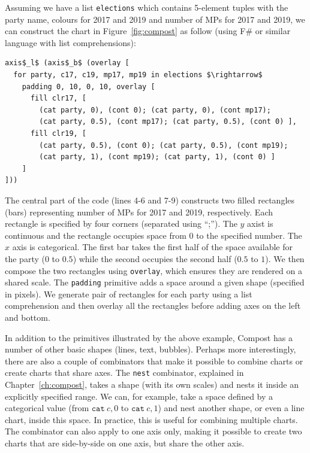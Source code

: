 \documentclass[fleqn,11pt]{report}
\theoremstyle{definition}
\begin{document}
Assuming we have a list \texttt{elections} which contains 5-element tuples with the party name,
colours for 2017 and 2019 and number of MPs for 2017 and 2019, we can construct the chart in
Figure~\ref{fig:compost} as follow (using F\# or similar language with list comprehensions):

\begin{lstlisting}[language=sharp,mathescape=true]
axis$_l$ (axis$_b$ (overlay [
  for party, c17, c19, mp17, mp19 in elections $\rightarrow$
    padding 0, 10, 0, 10, overlay [
      fill clr17, [
        (cat party, 0), (cont 0); (cat party, 0), (cont mp17);
        (cat party, 0.5), (cont mp17); (cat party, 0.5), (cont 0) ],
      fill clr19, [
        (cat party, 0.5), (cont 0); (cat party, 0.5), (cont mp19);
        (cat party, 1), (cont mp19); (cat party, 1), (cont 0) ]
    ]
]))
\end{lstlisting}

\noindent
The central part of the code (lines 4-6 and 7-9) constructs two filled rectangles (bars)
representing number of MPs for 2017 and 2019, respectively. Each rectangle is specified
by four corners (separated using ``;''). The $y$ axist is continuous and the rectangle occupies
space from 0 to the specified number. The $x$ axis is categorical. The first bar takes the
first half of the space available for the party ($0$ to $0.5$) while the second occupies the
second half ($0.5$ to $1$). We then compose the two rectangles using \texttt{overlay}, which
ensures they are rendered on a shared scale. The \texttt{padding} primitive adds a space around
a given shape (specified in pixels). We generate pair of rectangles for each party using a
list comprehension and then overlay all the rectangles before adding axes on the left and bottom.

In addition to the primitives illustrated by the above example, Compost has a number of
other basic shapes (lines, text, bubbles). Perhaps more interestingly, there are also a couple of
combinators that make it possible to combine charts or create charts that share axes.
The \texttt{nest} combinator, explained in Chapter~\ref{ch:compost}, takes a shape (with its own
scales) and nests it inside an explicitly specified range. We can, for example, take a space
defined by a categorical value (from $\texttt{cat}~c, 0$ to $\texttt{cat}~c, 1$) and nest
another shape, or even a line chart, inside this space. In practice, this is useful for combining
multiple charts. The combinator can also apply to one axis only, making it possible to create
two charts that are side-by-side on one axis, but share the other axis.
\end{document}
